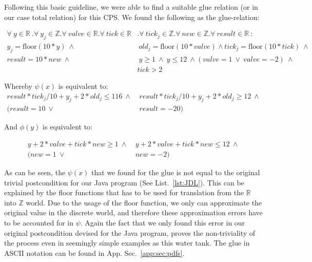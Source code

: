 Following this basic guideline, we were able to find a suitable glue relation (or in our case total relation) for this CPS. We found the following as the glue-relation:

\begin{equation}
	\begin{split}
		\forall~y \in \mathbb{R}~. \forall~y_j \in \mathbb{Z}. \forall~valve \in \mathbb{R}. \forall~tick \in \mathbb{R}&. \forall~tick_j \in \mathbb{Z} . \forall~new \in \mathbb{Z}. \forall~result \in \mathbb{R}~: \\  y_j = \textrm{floor}(10 * y)~\wedge&~ old_j = \textrm{floor}(10*valve) \wedge tick_j = \textrm{floor}(10*tick)~\wedge \\ result = 10 * new~\wedge&~ y \geq 1~\wedge~y \leq 12~\wedge  (valve = 1 ~\vee~valve = -2)~\wedge \\&tick > 2 
	\end{split}
	\label{eq:glueWatertank}
\end{equation}

Whereby \(\psi(x)\) is equivalent to:
\begin{equation}
	\begin{split}
		result * tick_j/10 + y_j + 2 * old_j \leq 116~\wedge&~result * tick_j/10 + y_j + 2 * old_j \geq 12~\wedge \\ (result = 10~\vee&~result = -20)
	\end{split}
	\label{eq:psiWatertank}
\end{equation}

And \(\phi(y)\) is equivalent to:

\begin{equation}
	\begin{split}
		 y + 2 * valve + tick * new \geq 1~\wedge&~y + 2 * valve + tick * new \leq 12~\wedge \\ (new = 1~\vee&~new = -2)
	\end{split}
	\label{eq:phiWatertank}
\end{equation}

As can be seen, the \(\psi(x)\) that we found for the glue is not equal to the original trivial postcondition for our Java program (See List.~\ref{lst:JDL}). This can be explained by the floor functions that has to be used for translation from the \(\mathbb{R}\) into \(\mathbb{Z}\) world. Due to the usage of the floor function, we only can approximate the original value in the discrete world, and therefore these approximation errors have to be accounted for in \(\psi\). Again the fact that we only found this error in our original postcondition devised for the Java program, proves the non-triviality of the process even in seemingly simple examples as this water tank. The glue in ASCII notation can be found in App. Sec.~\ref{app:sec:pdfs}.

